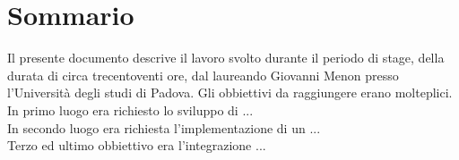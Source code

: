 \cleardoublepage
{}
{}
\begingroup
\let\clearpage\relax
\let\cleardoublepage\relax
\let\cleardoublepage\relax

\chapter*{Sommario}

Il presente documento descrive il lavoro svolto durante il periodo di stage, della durata di circa trecentoventi ore, dal laureando Giovanni Menon presso l'Università degli studi di Padova.
Gli obbiettivi da raggiungere erano molteplici.\\
In primo luogo era richiesto lo sviluppo di ... \\
In secondo luogo era richiesta l'implementazione di un ... \\
Terzo ed ultimo obbiettivo era l'integrazione ...




\endgroup

\vfill
